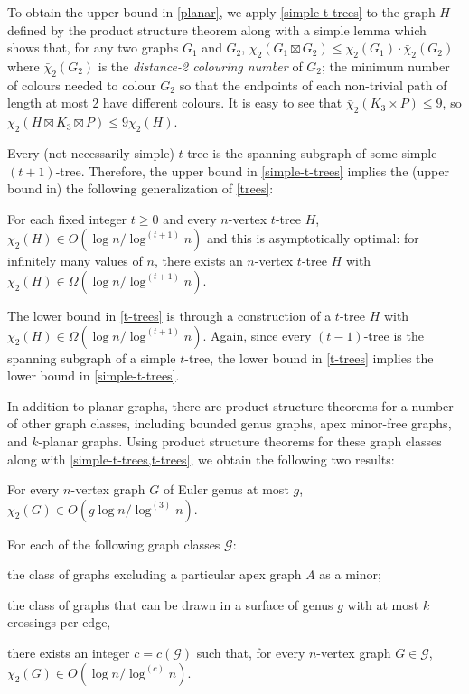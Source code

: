 \documentclass[kpfonts]{patmorin}
\newcommand{\trn}{\chi_2}
\newcommand{\dtcn}{\bar{\chi}_2}
\theoremstyle{named}
\begin{document}
To obtain the upper bound in \cref{planar}, we apply \cref{simple-t-trees} to the graph $H$ defined by the product structure theorem along with a simple lemma which shows that, for any two graphs $G_1$ and $G_2$, $\trn(G_1\boxtimes G_2)\le \trn(G_1)\cdot\dtcn(G_2)$ where $\dtcn(G_2)$ is the \emph{distance-2 colouring number} of $G_2$;  the minimum number of colours needed to colour $G_2$ so that the endpoints of each non-trivial path of length at most 2 have different colours.  It is easy to see that $\dtcn(K_3\times P)\le 9$, so $\trn(H\boxtimes K_3\boxtimes P)\le 9\trn(H)$.

Every (not-necessarily simple) $t$-tree is the spanning subgraph of some simple $(t+1)$-tree. Therefore, the upper bound in \cref{simple-t-trees} implies the (upper bound in) the following generalization of \cref{trees}:

\begin{thm}\label{t-trees}
    For each fixed integer $t\ge 0$ and every $n$-vertex $t$-tree $H$, $\trn(H) \in O(\log n/\log^{(t+1)} n)$ and this is asymptotically optimal: for infinitely many values of $n$, there exists an $n$-vertex $t$-tree $H$ with $\trn(H)\in\Omega(\log n/\log^{(t+1)} n)$.
\end{thm}

The lower bound in \cref{t-trees} is through a construction of a $t$-tree $H$ with
$\trn(H)\in\Omega(\log n/\log^{(t+1)} n)$.  Again, since every $(t-1)$-tree is the spanning subgraph of a simple $t$-tree, the lower bound in \cref{t-trees} implies the lower bound in \cref{simple-t-trees}.

In addition to planar graphs, there are product structure theorems for a number of other graph classes, including bounded genus graphs, apex minor-free graphs, and $k$-planar graphs.  Using product structure theorems for these graph classes along with \cref{simple-t-trees,t-trees}, we obtain the following two results:

\begin{thm}\label{bounded-genus}
    For every $n$-vertex graph $G$ of Euler genus at most $g$, $\trn(G)\in O(g\log n/\log^{(3)} n)$.
\end{thm}

\begin{thm}\label{meta-theorem}\label{meta}
    For each of the following graph classes $\mathcal{G}$:
    \begin{compactenum}
        \item the class of graphs excluding a particular apex graph $A$ as a minor;
        \item the class of graphs that can be drawn in a surface of genus $g$ with at most $k$ crossings per edge,
    \end{compactenum}
    there exists an integer $c=c(\mathcal{G})$ such that, for every $n$-vertex graph $G\in\mathcal{G}$, $\trn(G)\in O(\log n/\log^{(c)} n)$.
\end{thm}
\end{document}
